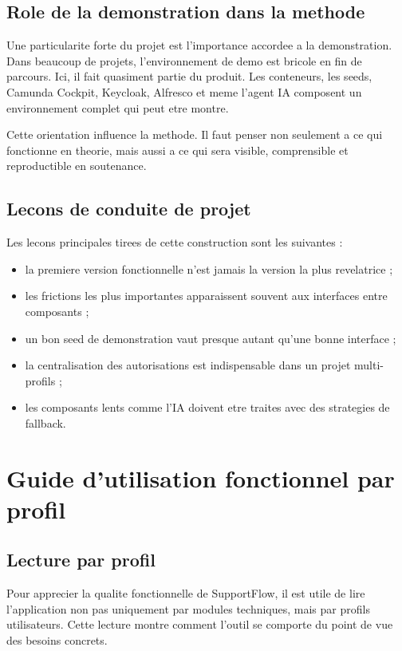 \documentclass[12pt,a4paper,oneside]{report}
\begin{document}
\section{Role de la demonstration dans la methode}

Une particularite forte du projet est l'importance accordee a la demonstration. Dans beaucoup de projets, l'environnement de demo est bricole en fin de parcours. Ici, il fait quasiment partie du produit. Les conteneurs, les seeds, Camunda Cockpit, Keycloak, Alfresco et meme l'agent IA composent un environnement complet qui peut etre montre.

Cette orientation influence la methode. Il faut penser non seulement a ce qui fonctionne en theorie, mais aussi a ce qui sera visible, comprensible et reproductible en soutenance.

\section{Lecons de conduite de projet}

Les lecons principales tirees de cette construction sont les suivantes :

\begin{itemize}[leftmargin=1.2cm]
  \item la premiere version fonctionnelle n'est jamais la version la plus revelatrice ;
  \item les frictions les plus importantes apparaissent souvent aux interfaces entre composants ;
  \item un bon seed de demonstration vaut presque autant qu'une bonne interface ;
  \item la centralisation des autorisations est indispensable dans un projet multi-profils ;
  \item les composants lents comme l'IA doivent etre traites avec des strategies de fallback.
\end{itemize}

\chapter{Guide d'utilisation fonctionnel par profil}

\section{Lecture par profil}

Pour apprecier la qualite fonctionnelle de SupportFlow, il est utile de lire l'application non pas uniquement par modules techniques, mais par profils utilisateurs. Cette lecture montre comment l'outil se comporte du point de vue des besoins concrets.
\end{document}
